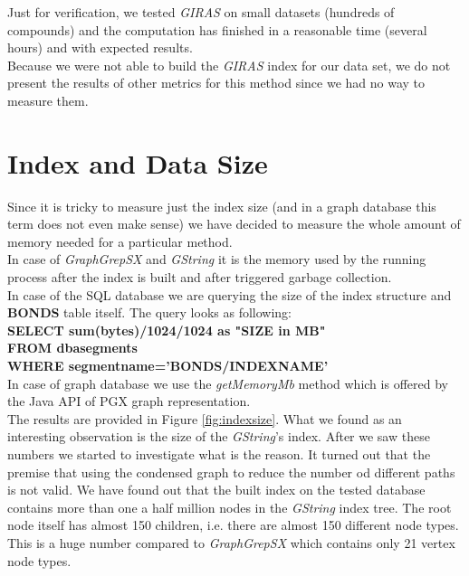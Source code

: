 Just for verification, we tested \textit{GIRAS} on small datasets (hundreds of compounds) and the computation has finished in a reasonable time (several hours) and with expected results.\\

Because we were not able to build the \textit{GIRAS} index for our data set, we do not present the results of other metrics for this method since we had no way to measure them.

\section{Index and Data Size}
Since it is tricky to measure just the index size (and in a graph database this term does not even make sense) we have decided to measure the whole amount of memory needed for a particular method.\\

In case of \textit{GraphGrepSX} and \textit{GString} it is the memory used by the running process after the index is built and after triggered garbage collection.\\

In case of the SQL database we are querying the size of the index structure and \textbf{BONDS} table itself. The query looks as following:\\

\noindent\textbf{SELECT sum(bytes)/1024/1024 as "SIZE in MB"}\\
\phantom{x}\hspace{3ex} \textbf{FROM dba\textunderscore segments}\\
\phantom{x}\hspace{3ex} \textbf{WHERE segment\textunderscore name='BONDS/INDEX\textunderscore NAME'}\\

In case of graph database we use the \textit{getMemoryMb} method which is offered by the Java API of PGX graph representation.\\

The results are provided in Figure \ref{fig:indexsize}. What we found as an interesting observation is the size of the \textit{GString}'s index. After we saw these numbers we started to investigate what is the reason. It turned out that the premise that using the condensed graph to reduce the number od different paths is not valid. We have found out that the built index on the tested database contains more than one a half million nodes in the \textit{GString} index tree. The root node itself has almost 150 children, i.e. there are almost 150 different node types. This is a huge number compared to \textit{GraphGrepSX} which contains only 21 vertex node types.\\

